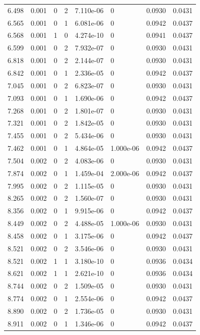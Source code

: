 \documentclass[preview]{standalone}
\begin{document}
{{{\begin{tabular}{L{1.2cm}C{1.2cm} C{0.3cm}C{0.5cm} C{1.4cm}C{1.4cm} C{1.4cm}C{1.4cm}}
  6.498  &  0.001  & 0     &  2 &  7.110e-06  & 0  & 0.0930 &  0.0431   \\ 
  6.565  &  0.001  & 0     &  1 &  6.081e-06  & 0  & 0.0942 &  0.0437   \\ 
  6.568  &  0.001  & 1     &  0 &  4.274e-10  & 0  & 0.0941 &  0.0437   \\ 
  6.599  &  0.001  & 0     &  2 &  7.932e-07  & 0  & 0.0930 &  0.0431   \\ 
  6.818  &  0.001  & 0     &  2 &  2.144e-07  & 0  & 0.0930 &  0.0431   \\ 
  6.842  &  0.001  & 0     &  1 &  2.336e-05  & 0  & 0.0942 &  0.0437   \\ 
  7.045  &  0.001  & 0     &  2 &  6.823e-07  & 0  & 0.0930 &  0.0431   \\ 
  7.093  &  0.001  & 0     &  1 &  1.690e-06  & 0  & 0.0942 &  0.0437   \\ 
  7.268  &  0.001  & 0     &  2 &  1.801e-07  & 0  & 0.0930 &  0.0431   \\ 
  7.321  &  0.001  & 0     &  2 &  1.842e-05  & 0  & 0.0930 &  0.0431   \\ 
  7.455  &  0.001  & 0     &  2 &  5.434e-06  & 0  & 0.0930 &  0.0431   \\ 
  7.462  &  0.001  & 0     &  1 &  4.864e-05  & 1.000e-06  & 0.0942 &  0.0437   \\ 
  7.504  &  0.002  & 0     &  2 &  4.083e-06  & 0  & 0.0930 &  0.0431   \\ 
  7.874  &  0.002  & 0     &  1 &  1.459e-04  & 2.000e-06  & 0.0942 &  0.0437   \\ 
  7.995  &  0.002  & 0     &  2 &  1.115e-05  & 0  & 0.0930 &  0.0431   \\ 
  8.265  &  0.002  & 0     &  2 &  1.560e-07  & 0  & 0.0930 &  0.0431   \\ 
  8.356  &  0.002  & 0     &  1 &  9.915e-06  & 0  & 0.0942 &  0.0437   \\ 
  8.449  &  0.002  & 0     &  2 &  4.488e-05  & 1.000e-06  & 0.0930 &  0.0431   \\ 
  8.458  &  0.002  & 0     &  1 &  3.175e-06  & 0  & 0.0942 &  0.0437   \\ 
  8.521  &  0.002  & 0     &  2 &  3.546e-06  & 0  & 0.0930 &  0.0431   \\ 
  8.521  &  0.002  & 1     &  1 &  3.180e-10  & 0  & 0.0936 &  0.0434   \\ 
  8.621  &  0.002  & 1     &  1 &  2.621e-10  & 0  & 0.0936 &  0.0434   \\ 
  8.744  &  0.002  & 0     &  2 &  1.509e-05  & 0  & 0.0930 &  0.0431   \\ 
  8.774  &  0.002  & 0     &  1 &  2.554e-06  & 0  & 0.0942 &  0.0437   \\ 
  8.890  &  0.002  & 0     &  2 &  1.736e-05  & 0  & 0.0930 &  0.0431   \\ 
  8.911  &  0.002  & 0     &  1 &  1.346e-06  & 0  & 0.0942 &  0.0437   \\ 
\hline 
\end{tabular} 

}}}
\end{document}
